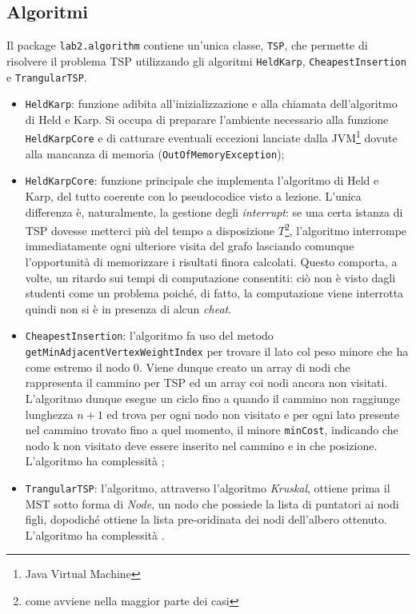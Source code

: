 \subsection{Algoritmi}
Il package \texttt{lab2.algorithm} contiene un'unica classe, \texttt{TSP}, che permette di risolvere il problema TSP utilizzando gli algoritmi \texttt{HeldKarp}, \texttt{CheapestInsertion} e \texttt{TrangularTSP}.
\begin{itemize}
	\item \texttt{HeldKarp}: funzione adibita all'inizializzazione e alla chiamata dell'algoritmo di Held e Karp. Si occupa di preparare l'ambiente necessario alla funzione \texttt{HeldKarpCore} e di catturare eventuali eccezioni lanciate dalla JVM\footnote{Java Virtual Machine} dovute alla mancanza di memoria (\texttt{OutOfMemoryException});
	\item \texttt{HeldKarpCore}: funzione principale che implementa l'algoritmo di Held e Karp, del tutto coerente con lo pseudocodice visto a lezione. L'unica differenza è, naturalmente, la gestione degli \textit{interrupt}: se una certa istanza di TSP dovesse metterci più del tempo a disposizione $T$\footnote{come avviene nella maggior parte dei casi}, l'algoritmo interrompe immediatamente ogni ulteriore visita del grafo lasciando comunque l'opportunità di memorizzare i risultati finora calcolati. Questo comporta, a volte, un ritardo sui tempi di computazione consentiti: ciò non è visto dagli studenti come un problema poiché, di fatto, la computazione viene interrotta quindi non si è in presenza di alcun \textit{cheat}.
	\item \texttt{CheapestInsertion}: l'algoritmo fa uso del metodo \texttt{getMinAdjacentVertexWeightIndex} per trovare il lato col peso minore che ha come estremo il nodo 0. Viene dunque creato un array di nodi che rappresenta il cammino per TSP ed un array coi nodi ancora non visitati. L'algoritmo dunque esegue un ciclo fino a quando il cammino non raggiunge lunghezza $n+1$ ed trova per ogni nodo non visitato e per ogni lato presente nel cammino trovato fino a quel momento, il minore \texttt{minCost}, indicando che nodo k non visitato deve essere inserito nel cammino e in che posizione. L'algoritmo ha complessità ;
	\item \texttt{TrangularTSP}: l'algoritmo, attraverso l'algoritmo \textit{Kruskal}, ottiene prima il MST sotto forma di \textit{Node}, un nodo che possiede la lista di puntatori ai nodi figli, dopodiché ottiene la lista pre-oridinata dei nodi dell'albero ottenuto. L'algoritmo ha complessità .
\end{itemize}

